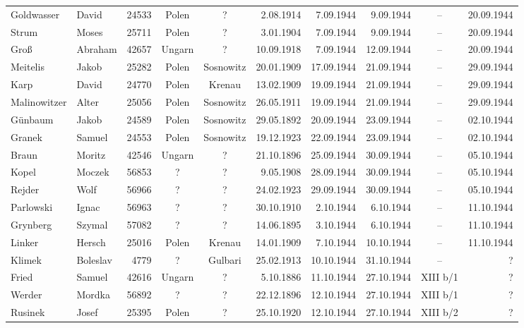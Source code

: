 \documentclass[a4paper,12pt,ngerman,
]{nisebook}
\begin{document}
\begin{tiny}
\begin{longtable}[l]{|l|l|r|c|c|r|r|r|c|r|}
Goldwasser  &  David  & 24533 &  Polen  &  ?  & 2.08.1914 & 7.09.1944 & 9.09.1944 &  --  &  20.09.1944 \\[3pt]
Strum  &  Moses  & 25711 &  Polen  &  ?  & 3.01.1904 & 7.09.1944 & 9.09.1944 &  --  &  20.09.1944 \\[3pt]
Groß  &  Abraham  & 42657 &  Ungarn  &  ?  & 10.09.1918 & 7.09.1944 & 12.09.1944 &  --  &  20.09.1944 \\[3pt]
Meitelis  &  Jakob  & 25282 &  Polen  &  Sosnowitz  & 20.01.1909 & 17.09.1944 & 21.09.1944 &  --  &  29.09.1944 \\[3pt]
Karp   &  David  & 24770 &  Polen  &  Krenau  & 13.02.1909 & 19.09.1944 & 21.09.1944 &  --  &  29.09.1944 \\[3pt]
Malinowitzer  &  Alter  & 25056 &  Polen  &  Sosnowitz  & 26.05.1911 & 19.09.1944 & 21.09.1944 &  --  &  29.09.1944 \\[3pt]
Günbaum  &  Jakob  & 24589 &  Polen  &  Sosnowitz  & 29.05.1892 & 20.09.1944 & 23.09.1944 &  --  &  02.10.1944 \\[3pt]
Granek  &  Samuel  & 24553 &  Polen  &  Sosnowitz  & 19.12.1923 & 22.09.1944 & 23.09.1944 &  --  &  02.10.1944 \\[3pt]
Braun  &  Moritz  & 42546 &  Ungarn  &  ?  & 21.10.1896 & 25.09.1944 & 30.09.1944 &  --  &  05.10.1944 \\[3pt]
Kopel  &  Moczek  & 56853 &  ?  &  ?  & 9.05.1908 & 28.09.1944 & 30.09.1944 &  --  &  05.10.1944 \\[3pt]
Rejder  &  Wolf  & 56966 &  ?  &  ?  & 24.02.1923 & 29.09.1944 & 30.09.1944 &  --  &  05.10.1944 \\[3pt]
Parlowski  &  Ignac  & 56963 &  ?  &  ?  & 30.10.1910 & 2.10.1944 & 6.10.1944 &  --  &  11.10.1944 \\[3pt]
Grynberg  &  Szymal  & 57082 &  ?  &  ?  & 14.06.1895 & 3.10.1944 & 6.10.1944 &  --  &  11.10.1944 \\[3pt]
Linker  &  Hersch  & 25016 &  Polen  &  Krenau  & 14.01.1909 & 7.10.1944 & 10.10.1944 &  --  &  11.10.1944 \\[3pt]
Klimek  &  Boleslav  & 4779 &  ?  &  Gulbari  & 25.02.1913 & 10.10.1944 & 31.10.1944 &  --  &  ? \\[3pt]
Fried  &  Samuel  & 42616 &  Ungarn  &  ?  & 5.10.1886 & 11.10.1944 & 27.10.1944 &  XIII b/1  &  ? \\[3pt]
Werder  &  Mordka  & 56892 &  ?  &  ?  & 22.12.1896 & 12.10.1944 & 27.10.1944 &  XIII b/1  &  ? \\[3pt]
Rusinek  &  Josef  & 25395 &  Polen  &  ?  & 25.10.1920 & 12.10.1944 & 27.10.1944 &  XIII b/2  &  ? \\[3pt]

\end{longtable}
\end{tiny}
\end{document}
